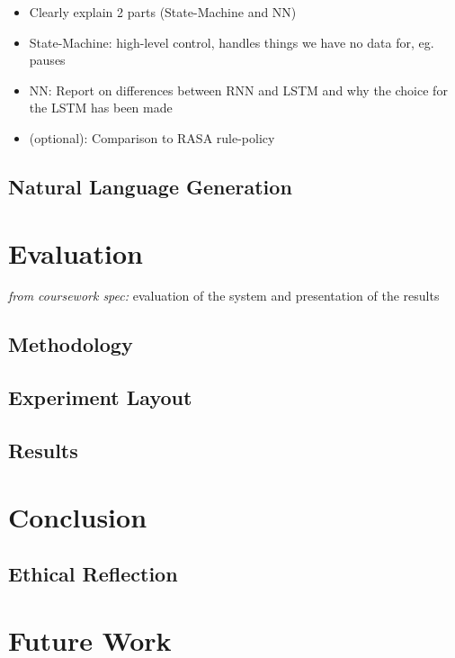 \documentclass[hidelinks, 11pt]{article}
\begin{document}
\begin{itemize}
  \item Clearly explain 2 parts (State-Machine and NN)
  \item State-Machine: high-level control, handles things we have no data for, eg. pauses
  \item NN: Report on differences between RNN and LSTM and why the choice for the LSTM has been made
  \item (optional): Comparison to RASA rule-policy
\end{itemize}

\subsection{Natural Language Generation}
\label{subsec:nlg}


\section{Evaluation}
\label{sec:evaluation}

\textit{from coursework spec:} evaluation of the system and presentation of the results

\subsection{Methodology}
\label{subsec:methodology}

\subsection{Experiment Layout}
\label{subsec:experiment_layout}

\subsection{Results}
\label{subsec:results}

\section{Conclusion}
\label{sec:conclusion}

\subsection{Ethical Reflection}
\label{subsec:ethics}

\section{Future Work}
\label{sec:future_work}
\end{document}
